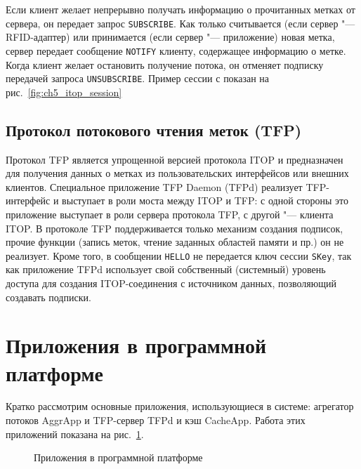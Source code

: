 Если клиент желает непрерывно получать информацию о прочитанных метках от сервера, он передает запрос \texttt{SUBSCRIBE}. Как только считывается (если сервер "--- RFID-адаптер) или принимается (если сервер "--- приложение) новая метка, сервер передает сообщение \texttt{NOTIFY} клиенту, содержащее информацию о метке. Когда клиент желает остановить получение потока, он отменяет подписку передачей запроса \texttt{UNSUBSCRIBE}. Пример сессии с показан на рис.~\ref{fig:ch5_itop_session}


\subsection{Протокол потокового чтения меток (TFP)}\label{sec:ch5_tfp}

Протокол TFP является упрощенной версией протокола ITOP и предназначен для получения данных о метках из пользовательских интерфейсов или внешних клиентов. Специальное приложение TFP Daemon (TFPd) реализует TFP-интерфейс и выступает в роли моста между ITOP и TFP: с одной стороны это приложение выступает в роли сервера протокола TFP, с другой "--- клиента ITOP. В протоколе TFP поддерживается только механизм создания подписок, прочие функции (запись меток, чтение заданных областей памяти и пр.) он не реализует. Кроме того, в сообщении \texttt{HELLO} не передается ключ сессии \texttt{SKey}, так как приложение TFPd использует свой собственный (системный) уровень доступа для создания ITOP-соединения с источником данных, позволяющий создавать подписки.



\section{Приложения в программной платформе}\label{sec:ch5_applications}

Кратко рассмотрим основные приложения, использующиеся в системе: агрегатор потоков AggrApp и TFP-сервер TFPd и кэш CacheApp. Работа этих приложений показана на рис.~\ref{fig:ch5_applications_scheme}.

\begin{figure}[ht]
  \caption{Приложения в программной платформе}
  \label{fig:ch5_applications_scheme}
\end{figure}

